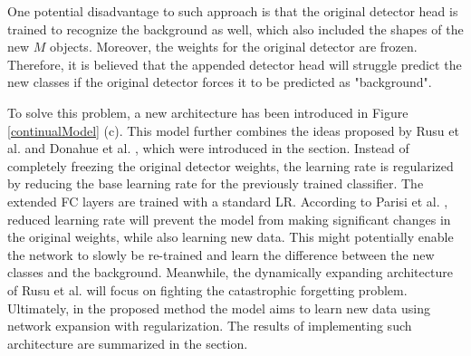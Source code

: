 One potential disadvantage to such approach is that the original detector head is trained to recognize the background as well, which also included the shapes of the new $M$ objects. Moreover, the weights for the original detector are frozen. Therefore, it is believed that the appended detector head will struggle predict the new classes if the original detector forces it to be predicted as "background". 

To solve this problem, a new architecture has been introduced in Figure \ref{continualModel} (c). This model further combines the ideas proposed by Rusu et al. \cite{Rusu2016} and Donahue et al. \cite{Donahue2013}, which were introduced in the  section. Instead of completely freezing the original detector weights, the learning rate is regularized by reducing the base learning rate for the previously trained classifier. The extended FC layers are trained with a standard LR.  According to Parisi et al. \cite{Parisi2018}, reduced learning rate will prevent the model from making significant changes in the original weights, while also learning new data. This might potentially enable the network to slowly be re-trained and learn the difference between the new classes and the background. Meanwhile, the dynamically expanding architecture of Rusu et al. \cite{Rusu2016} will focus on fighting the catastrophic forgetting problem. Ultimately, in the proposed method the model aims to learn new data using network expansion with regularization. The results of implementing such architecture are summarized in the  section. 



